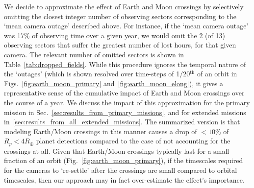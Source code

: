 We decide to approximate the effect of Earth and Moon crossings by selectively omitting the closest integer number of observing sectors corresponding to the `mean camera outage' described above.
For instance, if the `mean camera outage' was 17\% of \tesss observing time over a given year, we would omit the 2 (of 13) observing sectors that suffer the greatest number of lost hours, for that given camera.
The relevant number of omitted sectors is shown in Table~\ref{tab:dropped_fields}.
While this procedure ignores the temporal nature of the `outages' (which is shown resolved over time-steps of 1/20$^\mathrm{th}$ of an orbit in Figs.~\ref{fig:earth_moon_primary} and~\ref{fig:earth_moon_elong}), it gives a representative sense of the cumulative impact of Earth and Moon crossings over the course of a year.
We discuss the impact of this approximation for the primary mission in Sec.~\ref{sec:results_from_primary_missions}, and for extended missions in~\ref{sec:results_from_all_extended_missions}.
The summarized version is that modeling Earth/Moon crossings in this manner causes a drop of $<10\%$ of $R_p < 4R_\oplus$ planet detections compared to the case of not accounting for the crossings at all.
Given that Earth/Moon crossings typically last for a small fraction of an orbit (Fig.~\ref{fig:earth_moon_primary}), if the timescales required for the cameras to `re-settle' after the crossings are small compared to orbital timescales, then our approach may in fact over-estimate the effect's importance.

